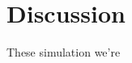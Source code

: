 \documentclass{article}
\begin{document}

\section{Discussion}


These simulation we're

\newpage
{}

\end{document}

